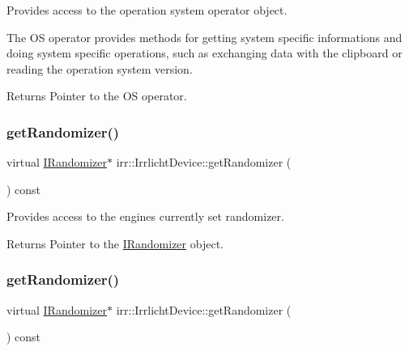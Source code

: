 Provides access to the operation system operator object. 

The OS operator provides methods for getting system specific informations and doing system specific operations, such as exchanging data with the clipboard or reading the operation system version. \begin{DoxyReturn}{Returns}
Pointer to the OS operator. 
\end{DoxyReturn}
\mbox{\label{classirr_1_1IrrlichtDevice_aaba0cb18cac48e381d841ad763c7ea8b}} 
\subsubsection{\texorpdfstring{get\+Randomizer()}{getRandomizer()}\hspace{0.1cm}{\footnotesize\ttfamily [1/3]}}
{\footnotesize\ttfamily virtual \hyperlink{classirr_1_1IRandomizer}{I\+Randomizer}$\ast$ irr\+::\+Irrlicht\+Device\+::get\+Randomizer (\begin{DoxyParamCaption}{ }\end{DoxyParamCaption}) const\hspace{0.3cm}{\ttfamily [pure virtual]}}



Provides access to the engine\textquotesingle{}s currently set randomizer. 

\begin{DoxyReturn}{Returns}
Pointer to the \hyperlink{classirr_1_1IRandomizer}{I\+Randomizer} object. 
\end{DoxyReturn}
\mbox{\label{classirr_1_1IrrlichtDevice_aaba0cb18cac48e381d841ad763c7ea8b}} 
\subsubsection{\texorpdfstring{get\+Randomizer()}{getRandomizer()}\hspace{0.1cm}{\footnotesize\ttfamily [2/3]}}
{\footnotesize\ttfamily virtual \hyperlink{classirr_1_1IRandomizer}{I\+Randomizer}$\ast$ irr\+::\+Irrlicht\+Device\+::get\+Randomizer (\begin{DoxyParamCaption}{ }\end{DoxyParamCaption}) const\hspace{0.3cm}{\ttfamily [pure virtual]}}



